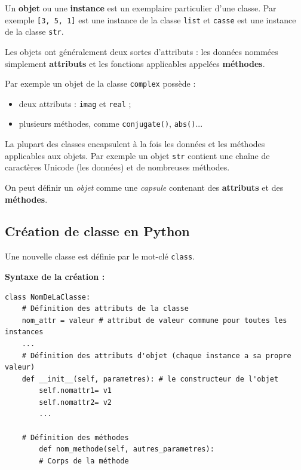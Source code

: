 \documentclass[a4paper,11pt]{article}
\theoremstyle{mytheor}
\begin{document}
\noindent
Un \textbf{objet} ou une \textbf{instance} est un exemplaire particulier d'une classe. Par exemple \texttt{[3, 5, 1]} est une instance de la classe \texttt{list} et \texttt{casse} est une instance de la classe \texttt{str}.

Les objets ont généralement deux sortes d'attributs : les données nommées simplement \textbf{attributs} et les fonctions applicables appelées \textbf{méthodes}.

Par exemple un objet de la classe \texttt{complex} possède :
\begin{itemize}
	\item deux attributs : \texttt{imag} et \texttt{real} ;
	
	\item plusieurs méthodes, comme \texttt{conjugate()}, \texttt{abs()}...
\end{itemize}

\noindent
La plupart des classes encapsulent à la fois les données et les méthodes applicables aux objets. Par exemple un objet \texttt{str} contient une chaîne de caractères Unicode (les données) et de nombreuses méthodes.

On peut définir un \emph{objet} comme une \emph{capsule} contenant des \textbf{attributs} et des \textbf{méthodes}.

\subsection{Création de classe en Python}
Une nouvelle classe est définie par le mot-clé \texttt{class}.

\textbf{Syntaxe de la création :}

\begin{lstlisting}
class NomDeLaClasse:
	# Définition des attributs de la classe
	nom_attr = valeur # attribut de valeur commune pour toutes les instances
	...
	# Définition des attributs d'objet (chaque instance a sa propre valeur)
	def __init__(self, parametres): # le constructeur de l'objet
		self.nomattr1= v1
		self.nomattr2= v2
		...
		
	# Définition des méthodes
		def nom_methode(self, autres_parametres):
		# Corps de la méthode
\end{lstlisting}
\noindent
\end{document}
